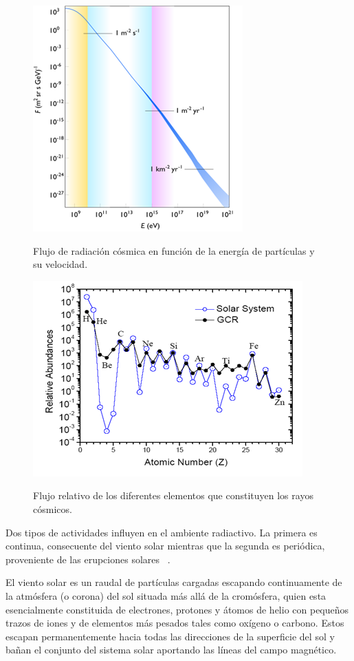 \documentclass[a4paper,openright,12pt]{report}
\begin{document}
\begin{figure}[H]
	\centering
	\includegraphics[width=0.47 \textwidth]{img/intr1.png}
	\caption{Flujo de radiación cósmica en función de la energía de  partículas y su velocidad.  } \cite{rayoss}
    
	\label{radiation}
\end{figure}

\begin{figure}[H]
	\centering
	\includegraphics[width=0.47 \textwidth]{img/2.png}
	\caption{Flujo relativo de los diferentes elementos que constituyen los rayos cósmicos. }\cite{mansour2012methodes}
	\label{radiation2}
\end{figure}

Dos tipos de actividades influyen en el ambiente radiactivo. La primera es continua, consecuente del viento solar mientras que la segunda es periódica, proveniente de las erupciones solares ~\cite{boudenot1995}.

El viento solar es un raudal de partículas cargadas escapando continuamente de la atmósfera (o corona) del sol situada más allá de la cromósfera, quien esta esencialmente constituida de electrones,  protones y  átomos de helio con pequeños trazos de iones y de elementos más pesados tales como  oxígeno o  carbono. Estos  escapan permanentemente hacia todas las direcciones de la superficie del sol y bañan el conjunto del sistema solar aportando  las líneas del campo magnético.
\end{document}
